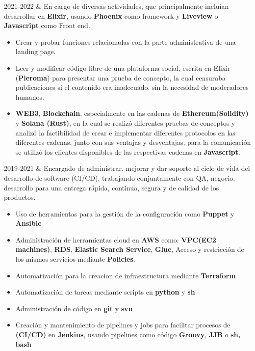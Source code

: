 \documentclass[
    changecolor={111, 156, 45}, 
]{cv-roald}
\begin{document}
\begin{tabularcv}
2021-2022 & 
\newline
En cargo de diversas actividades, que principalmente incluían desarrollar en \textbf{Elixir}, usando \textbf{Phoenix} como framework y \textbf{Liveview} o \textbf{Javascript} como Front end.

\begin{itemize}
    \item Crear y probar funciones relacionadas con la parte administrativa de una landing page.
    \item Leer y modificar código libre de una plataforma social, escrita en Elixir (\textbf{Pleroma}) para presentar una prueba de concepto, la cual censuraba publicaciones si el contenido era inadecuado. sin la necesidad de moderadores humanos.
    \item \textbf{WEB3}, \textbf{Blockchain}, especialmente en las cadenas de \textbf{Ethereum(Solidity)} y \textbf{Solana (Rust)}, en la cual se realizó diferentes pruebas de conceptos y analizó la factibilidad de crear e implementar diferentes protocolos en las diferentes cadenas, junto con sus ventajas y desventajas, para la comunicación se utilizó los clientes disponibles de las respectivas cadenas en \textbf{Javascript}.
\end{itemize}
\end{tabularcv}

\begin{tabularcv}
2019-2021   &   
                \newline Encargado de administrar, mejorar y dar soporte al ciclo de vida del desarrollo de software (CI/CD), trabajando conjuntamente con QA, negocio, desarrollo para una entrega rápida, continua, segura y de calidad de los productos.
                 \begin{itemize}
                  \item Uso de herramientas para la gestión de la configuración como \textbf{Puppet} y \textbf{Ansible}
                  \item Administración de herramientas cloud en \textbf{AWS} como: \textbf{VPC(EC2 machines)}, \textbf{RDS}, \textbf{Elastic Search Service}, \textbf{Glue}, Acceso y restricción de los mismos servicios mediante \textbf{Policies}.
                  \item Automatización para la creacion de infraestructura mediante \textbf{Terraform}
                  \item Automatización de tareas mediante scripts en \textbf{python} y \textbf{sh}
                  \item Administración de código en \textbf{git} y \textbf{svn} 
                  \item Creación y mantenimiento de pipelines y jobs para facilitar procesos de \textbf{(CI/CD)} en \textbf{Jenkins}, usando pipelines como código  \textbf{Groovy}, \textbf{JJB} o \textbf{sh, bash}
                \end{itemize} 
\end{tabularcv}
\end{document}
